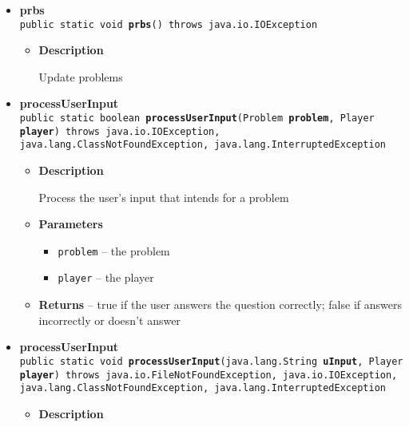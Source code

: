 {{{{{\begin{itemize}
{\begin{itemize}
{Update location information from the csv file
}
\end{itemize}
}%
\item{ 
{\bf  prbs}\\
\texttt{public static void\ {\bf  prbs}() throws java.io.IOException
\label{personOfInterest.Game.prbs()}}%
\begin{itemize}
\item{
{\bf  Description}

Update problems
}
\end{itemize}
}%
\item{ 
{\bf  processUserInput}\\
\texttt{public static boolean\ {\bf  processUserInput}(\texttt{Problem} {\bf  problem},
\texttt{Player} {\bf  player}) throws java.io.IOException, java.lang.ClassNotFoundException, java.lang.InterruptedException
\label{personOfInterest.Game.processUserInput(personOfInterest.Problem, personOfInterest.Player)}}%
\begin{itemize}
\item{
{\bf  Description}

Process the user's input that intends for a problem
}
\item{
{\bf  Parameters}
  \begin{itemize}
   \item{
\texttt{problem} -- the problem}
   \item{
\texttt{player} -- the player}
  \end{itemize}
}%
\item{{\bf  Returns} -- 
true if the user answers the question correctly; false if answers incorrectly or doesn't answer 
}%
\end{itemize}
}%
\item{ 
{\bf  processUserInput}\\
\texttt{public static void\ {\bf  processUserInput}(\texttt{java.lang.String} {\bf  uInput},
\texttt{Player} {\bf  player}) throws java.io.FileNotFoundException, java.io.IOException, java.lang.ClassNotFoundException, java.lang.InterruptedException
\label{personOfInterest.Game.processUserInput(java.lang.String, personOfInterest.Player)}}%
\begin{itemize}
\item{
{\bf  Description}

}
\end{itemize}}
\end{itemize}}}}}}
